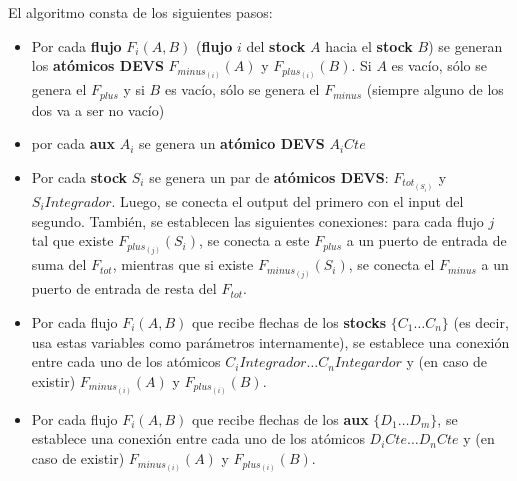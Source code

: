 El algoritmo consta de los siguientes pasos:
\begin{itemize}
	\item Por cada \textbf{flujo} $F_{i}(A,B)$ (\textbf{flujo} $i$ del \textbf{stock} $A$ hacia el \textbf{stock} $B$) se generan los \textbf{atómicos DEVS} $F_{minus_{(i)}}(A)$ y $F_{plus_{(i)}}(B)$. Si $A$ es vacío, sólo se genera el $F_{plus}$ y si $B$ es vacío, sólo se genera el $F_{minus}$ (siempre alguno de los dos va a ser no vacío)

	\item por cada \textbf{aux} $A_i$ se genera un \textbf{atómico DEVS} $A_{i}Cte$

	\item Por cada \textbf{stock} $S_i$ se genera un par de \textbf{atómicos DEVS}: $F_{tot_{(S_i)}}$ y $S_{i}Integrador$. Luego, se conecta el output del primero con el input del segundo. También, se establecen las siguientes conexiones: para cada flujo $j$ tal que existe $F_{plus_{(j)}}(S_i)$, se conecta a este $F_{plus}$ a un puerto de entrada de suma del $F_{tot}$, mientras que si existe $F_{minus_{(j)}}(S_i)$, se conecta el $F_{minus}$ a un puerto de entrada de resta del $F_{tot}$.
	
	\item Por cada flujo $F_{i}(A,B)$ que recibe flechas de los \textbf{stocks} $\{ C_1 \dots C_n \}$ (es decir, usa estas variables como parámetros internamente), se establece una conexión entre cada uno de los atómicos $C_{i}Integrador \dots C_{n}Integardor$ y (en caso de existir) $F_{minus_{(i)}}(A)$ y $F_{plus_{(i)}}(B)$.

	\item Por cada flujo $F_{i}(A,B)$ que recibe flechas de los \textbf{aux} $\{ D_1 \dots D_m \}$, se establece una conexión entre cada uno de los atómicos $D_{i}Cte \dots D_{n}Cte$ y (en caso de existir) $F_{minus_{(i)}}(A)$ y $F_{plus_{(i)}}(B)$.

\end{itemize}
